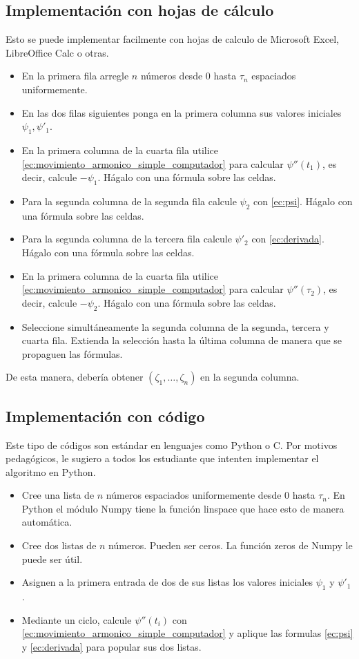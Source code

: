 \documentclass{article}
\begin{document}
\subsection{Implementación con hojas de cálculo}

Esto se puede implementar facilmente con hojas de calculo de Microsoft Excel, LibreOffice Calc o otras.
\begin{itemize}
\item En la primera fila arregle $n$ números desde $0$ hasta $\tau_n$ espaciados uniformemente.
\item En las dos filas siguientes ponga en la primera columna sus valores iniciales $\psi_1,\psi'_1$.
\item En la primera columna de la cuarta fila utilice \eqref{ec:movimiento_armonico_simple_computador} para calcular $\psi''(t_1)$, es decir, calcule $-\psi_1$. Hágalo con una fórmula sobre las celdas.
\item Para la segunda columna de la segunda fila calcule $\psi_2$ con \eqref{ec:psi}. Hágalo con una fórmula sobre las celdas.
\item Para la segunda columna de la tercera fila calcule $\psi'_2$ con \eqref{ec:derivada}. Hágalo con una fórmula sobre las celdas.
\item En la primera columna de la cuarta fila utilice \eqref{ec:movimiento_armonico_simple_computador} para calcular $\psi''(\tau_2)$, es decir, calcule $-\psi_2$. Hágalo con una fórmula sobre las celdas.
\item Seleccione simultáneamente la segunda columna de la segunda, tercera y cuarta fila. Extienda la selección hasta la última columna de manera que se propaguen las fórmulas.
\end{itemize}
De esta manera, debería obtener $(\zeta_1,\dots,\zeta_n)$ en la segunda columna.

\subsection{Implementación con código}

Este tipo de códigos son estándar en lenguajes como Python o C. Por motivos pedagógicos, le sugiero a todos los estudiante que intenten implementar el algoritmo en Python.
\begin{itemize}
\item Cree una lista de $n$ números espaciados uniformemente desde $0$ hasta $\tau_n$. En Python el módulo Numpy tiene la función linspace que hace esto de manera automática.
\item Cree dos listas de $n$ números. Pueden ser ceros. La función zeros de Numpy le puede ser útil.
\item Asignen a la primera entrada de dos de sus listas los valores iniciales $\psi_1$ y $\psi'_1$.
\item Mediante un ciclo, calcule $\psi''(t_i)$ con \eqref{ec:movimiento_armonico_simple_computador} y aplique las formulas \eqref{ec:psi} y \eqref{ec:derivada} para popular sus dos listas.
\end{itemize} 
\end{document}
